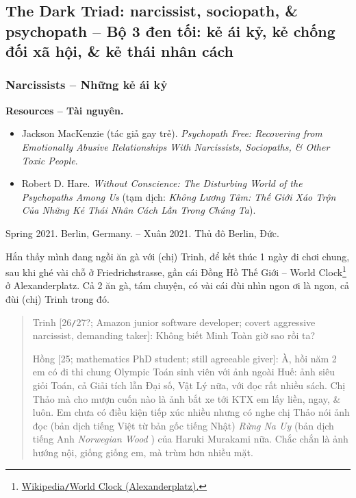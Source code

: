 \documentclass[12pt]{article}
\begin{document}
\subsection{The Dark Triad: narcissist, sociopath, \& psychopath -- Bộ 3 đen tối: kẻ ái kỷ, kẻ chống đối xã hội, \& kẻ thái nhân cách}

\subsubsection{Narcissists -- Những kẻ ái kỷ}
\textbf{\textsf{Resources -- Tài nguyên.}}
\begin{itemize}
	\item \cite{MacKenzie2015} {\sc Jackson MacKenzie} (tác giả gay trẻ). {\it Psychopath Free: Recovering from Emotionally Abusive Relationships With Narcissists, Sociopaths, \& Other Toxic People}.
	\item \cite{Hare1999} {\sc Robert D. Hare}. {\it Without Conscience: The Disturbing World of the Psychopaths Among Us} (tạm dịch: {\it Không Lương Tâm: Thế Giới Xáo Trộn Của Những Kẻ Thái Nhân Cách Lẫn Trong Chúng Ta}).
\end{itemize}
\begin{flushright}
	Spring 2021. Berlin, Germany. -- Xuân 2021. Thủ đô Berlin, Đức.
\end{flushright}
Hắn thấy mình đang ngồi ăn gà với (chị) Trinh, để kết thúc 1 ngày đi chơi chung, sau khi ghé vài chỗ ở Friedrichstrasse, gần cái Đồng Hồ Thế Giới -- World Clock\footnote{\href{https://en.wikipedia.org/wiki/World_Clock_(Alexanderplatz)}{Wikipedia{\tt/}World Clock (Alexanderplatz).}} ở Alexanderplatz. Cả 2 ăn gà, tám chuyện, có vài cái đùi nhìn ngon ơi là ngon, cả đùi (chị) Trinh trong đó. 
\begin{quote}
	{\sf Trinh [26{\tt/}27?; Amazon junior software developer; covert aggressive narcissist, demanding taker]}: Không biết Minh Toàn giờ sao rồi ta?
	
	{\sf Hồng [25; mathematics PhD student; still agreeable giver]}: À, hồi năm 2 em có đi thi chung Olympic Toán sinh viên với ảnh ngoài Huế: ảnh siêu giỏi Toán, cả Giải tích lẫn Đại số, Vật Lý nữa, với đọc rất nhiều sách. Chị Thảo mà cho mượn cuốn nào là ảnh bắt xe tới KTX em lấy liền, ngay, \& luôn. Em chưa có điều kiện tiếp xúc nhiều nhưng có nghe chị Thảo nói ảnh đọc (bản dịch tiếng Việt từ bản gốc tiếng Nhật) {\it Rừng Na Uy} \cite{Murakami_rung_Na_Uy} (bản dịch tiếng Anh {\it Norwegian Wood} \cite{Murakami_Norwegian_wood}) của {\sc Haruki Murakami} nữa. Chắc chắn là ảnh hướng nội, giống giống em, mà trùm hơn nhiều mặt.
\end{quote}
\end{document}
